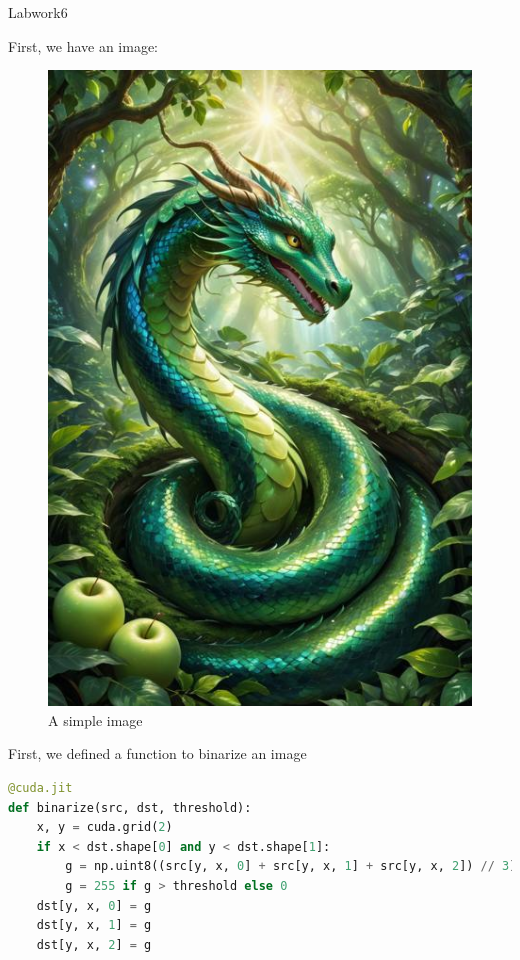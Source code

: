 \documentclass[12pt]{article}
\begin{document}
\begin{center}
    \vspace*{1.8cm}
    \Large
    Labwork6\\
\end{center}

\noindent
First, we have an image:
\begin{figure}[H]
\centering
    \includegraphics[height = 0.5\textheight, keepaspectratio]{images/image.jpeg}
    \caption{A simple image}
\end{figure}


\noindent
First, we defined a function to binarize an image

\begin{lstlisting}[language=Python]
@cuda.jit
def binarize(src, dst, threshold):
    x, y = cuda.grid(2)
    if x < dst.shape[0] and y < dst.shape[1]:
        g = np.uint8((src[y, x, 0] + src[y, x, 1] + src[y, x, 2]) // 3)
        g = 255 if g > threshold else 0
    dst[y, x, 0] = g
    dst[y, x, 1] = g
    dst[y, x, 2] = g
\end{lstlisting}
\end{document}

